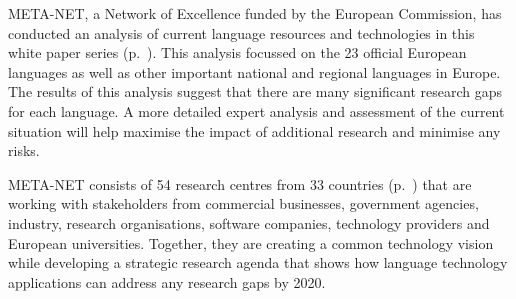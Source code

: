 \begin{Parallel}[c]{78mm}{78mm}
{META-NET, a Network of Excellence funded by the European Commission, has conducted an  analysis of current language resources and technologies in this white paper series (p.~\pageref{whitepaperseries}). This analysis focussed on the 23 official European languages as well as other important national and regional languages in Europe. The results of this analysis suggest that there are many significant research gaps for each language. A more detailed expert analysis and assessment of the current situation will help maximise the impact of additional research and minimise any risks.

META-NET consists of 54 research centres from 33 countries (p.~\pageref{metanetmembers}) that are working with stakeholders from commercial businesses, government agencies, industry, research organisations, software companies, technology providers and European universities. Together, they are creating a common technology vision while developing a strategic research agenda that shows how language technology applications can address any research gaps by 2020.} 
\ParallelPar
\end{Parallel}

\clearpage
\makefundingnotice
\clearpage



\renewcommand\contentsname{}

\tableofcontents
{}

\clearpage


\setcounter{page}{1}
\pagestyle{scrheadings}




